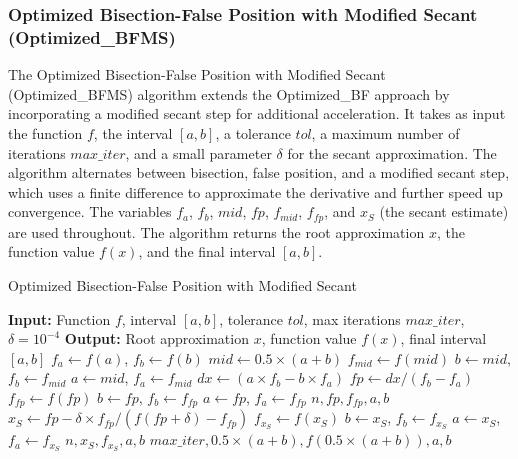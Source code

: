 \documentclass[reprint, amsmath, amssymb, aps, prl]{revtex4-2}
\begin{document}
\subsubsection{Optimized Bisection-False Position with Modified Secant (Optimized\_BFMS)}

The Optimized Bisection-False Position with Modified Secant (Optimized\_BFMS) algorithm extends the Optimized\_BF approach by incorporating a modified secant step for additional acceleration. It takes as input the function $f$, the interval $[a, b]$, a tolerance $tol$, a maximum number of iterations $max\_iter$, and a small parameter $\delta$ for the secant approximation. The algorithm alternates between bisection, false position, and a modified secant step, which uses a finite difference to approximate the derivative and further speed up convergence. The variables $f_a$, $f_b$, $mid$, $fp$, $f_{mid}$, $f_{fp}$, and $x_S$ (the secant estimate) are used throughout. The algorithm returns the root approximation $x$, the function value $f(x)$, and the final interval $[a, b]$.

\vspace{1em}
\begin{algorithm}[h!]
\caption{Optimized Bisection-False Position with Modified Secant}
\begin{algorithmic}[1]
\State \textbf{Input:} Function $f$, interval $[a, b]$, tolerance $tol$, max iterations $max\_iter$, $\delta = 10^{-4}$
\State \textbf{Output:} Root approximation $x$, function value $f(x)$, final interval $[a, b]$
\State $f_a \gets f(a)$, $f_b \gets f(b)$
    \State $mid \gets 0.5 \times (a + b)$
    \State $f_{mid} \gets f(mid)$
        \State $b \gets mid$, $f_b \gets f_{mid}$
    \Else
        \State $a \gets mid$, $f_a \gets f_{mid}$
    \EndIf
    \State $dx \gets (a \times f_b - b \times f_a)$
    \State $fp \gets dx / (f_b - f_a)$
    \State $f_{fp} \gets f(fp)$
        \State $b \gets fp$, $f_b \gets f_{fp}$
    \Else
        \State $a \gets fp$, $f_a \gets f_{fp}$
    \EndIf
        \State \Return $n, fp, f_{fp}, a, b$
    \EndIf
    \State $x_S \gets fp - \delta \times f_{fp} / (f(fp + \delta) - f_{fp})$
        \State $f_{x_S} \gets f(x_S)$
                \State $b \gets x_S$, $f_b \gets f_{x_S}$
            \Else
                \State $a \gets x_S$, $f_a \gets f_{x_S}$
            \EndIf
                \State \Return $n, x_S, f_{x_S}, a, b$
            \EndIf
        \EndIf
    \EndIf
\EndFor
\State \Return $max\_iter, 0.5 \times (a + b), f(0.5 \times (a + b)), a, b$
\end{algorithmic}
\end{algorithm}
\vspace{1em}
\end{document}
